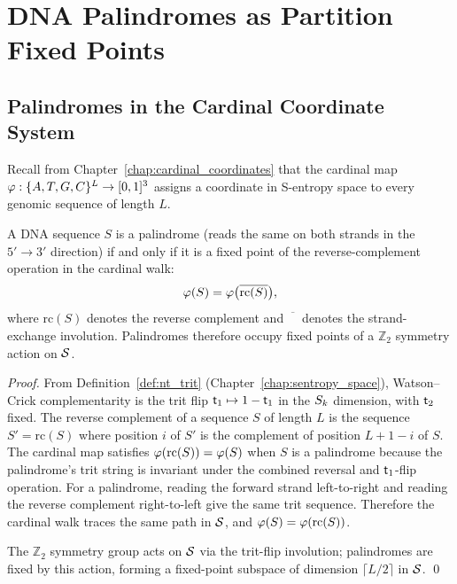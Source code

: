 \section{DNA Palindromes as Partition Fixed Points}
\label{sec:palindromes}

\subsection{Palindromes in the Cardinal Coordinate System}

Recall from Chapter~\ref{chap:cardinal_coordinates} that the cardinal map
$\varphi: \{A, T, G, C\}^L \to [0,1]^3$ assigns a coordinate in S-entropy
space to every genomic sequence of length $L$.

\begin{proposition}
\label{prop:palindrome_fixed}
A DNA sequence $S$ is a palindrome (reads the same on both strands in the
$5' \to 3'$ direction) if and only if it is a fixed point of the reverse-complement
operation in the cardinal walk:
\begin{equation}
  \varphi(S) = \varphi\bigl(\overline{\mathrm{rc}(S)}\bigr),
  \label{eq:palindrome_fixed}
\end{equation}
where $\mathrm{rc}(S)$ denotes the reverse complement and $\overline{\phantom{X}}$
denotes the strand-exchange involution. Palindromes therefore occupy fixed
points of a $\mathbb{Z}_2$ symmetry action on $\mathcal{S}$.
\end{proposition}

\begin{proof}
From Definition~\ref{def:nt_trit} (Chapter~\ref{chap:sentropy_space}), Watson--Crick
complementarity is the trit flip $\mathsf{t}_1 \mapsto 1 - \mathsf{t}_1$ in the $S_k$
dimension, with $\mathsf{t}_2$ fixed. The reverse complement of a sequence $S$ of
length $L$ is the sequence $S' = \mathrm{rc}(S)$ where position $i$ of $S'$
is the complement of position $L+1-i$ of $S$. The cardinal map satisfies
$\varphi(\mathrm{rc}(S)) = \varphi(S)$ when $S$ is a palindrome because
the palindrome's trit string is invariant under the combined reversal and
$\mathsf{t}_1$-flip operation. For a palindrome, reading the forward strand left-to-right
and reading the reverse complement right-to-left give the same trit sequence.
Therefore the cardinal walk traces the same path in $\mathcal{S}$, and
$\varphi(S) = \varphi(\mathrm{rc}(S))$.

The $\mathbb{Z}_2$ symmetry group acts on $\mathcal{S}$ via the trit-flip involution;
palindromes are fixed by this action, forming a fixed-point subspace of
dimension $\lceil L/2 \rceil$ in $\mathcal{S}$. \qed
\end{proof}

